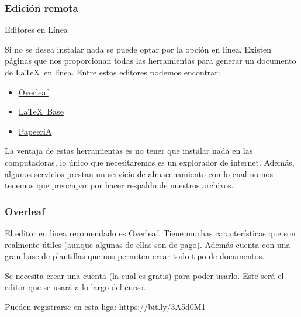 \documentclass[11pt]{beamer}
\begin{document}
	\subsubsection{Edición remota}
		\begin{frame}{Editores en Línea}
			\justifying

			Si no se desea instalar nada se puede optar por la opción en línea. Existen
			páginas que nos proporcionan todas las herramientas para generar un 
			documento de \LaTeX\ en línea. Entre estos editores podemos encontrar:
			
			\begin{itemize}
				\item \href{https://www.overleaf.com/}{Overleaf}
				\item \href{https://latexbase.com/}{\LaTeX\ Base}
				\item \href{https://papeeria.com/}{PapeeriA}
			\end{itemize}
			
			La ventaja de estas herramientas es no tener que instalar nada en las computadoras,
			lo único que necesitaremos es un explorador de internet. Además, algunos
			servicios prestan un servicio de almacenamiento con lo cual no nos tenemos 
			que preocupar por hacer respaldo de nuestros archivos.
		\end{frame}
		\begin{frame}
			\frametitle{Overleaf}
			
			\justifying

			El editor en línea recomendado es \href{https://www.overleaf.com/}{Overleaf}.
		    Tiene muchas características que son realmente útiles (aunque algunas de ellas
			son de pago). Además cuenta con una gran base de plantillas que nos permiten
			crear todo tipo de documentos.

			Se necesita crear una cuenta (la cual es gratis) para poder usarlo. Este será el
			editor que se usará a lo largo del curso.

			Pueden registrarse en esta liga: \url{https://bit.ly/3A5d0M1}

		\end{frame}
\end{document}
